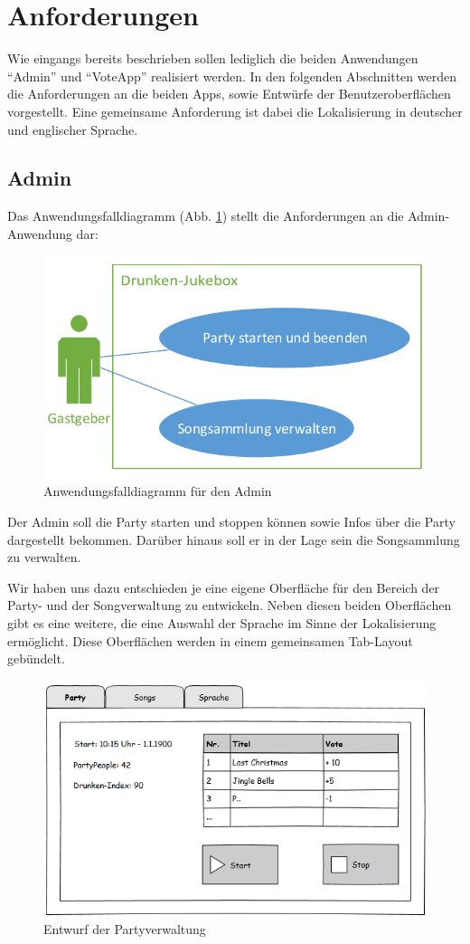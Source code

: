 \section{Anforderungen}
Wie eingangs bereits beschrieben sollen lediglich die beiden Anwendungen "`Admin"' und "`VoteApp"' realisiert werden. In den folgenden Abschnitten werden die Anforderungen an die beiden Apps, sowie Entwürfe der Benutzeroberflächen vorgestellt. Eine gemeinsame Anforderung ist dabei die Lokalisierung in deutscher und englischer Sprache.

\subsection{Admin}
Das Anwendungsfalldiagramm (Abb. \ref{fig:AdminUseCase}) stellt die Anforderungen an die Admin-Anwendung dar:

\begin{figure}[H]
\centering
\includegraphics[width=0.7\linewidth]{Bilder/AdminUseCase}
\caption{Anwendungsfalldiagramm für den Admin}
\label{fig:AdminUseCase}
\end{figure}

Der Admin soll die Party starten und stoppen können sowie Infos über die Party dargestellt bekommen. Darüber hinaus soll er in der Lage sein die Songsammlung zu verwalten.

Wir haben uns dazu entschieden je eine eigene Oberfläche für den Bereich der Party- und der Songverwaltung zu entwickeln. Neben diesen beiden Oberflächen gibt es eine weitere, die eine Auswahl der Sprache im Sinne der Lokalisierung ermöglicht. Diese Oberflächen werden in einem gemeinsamen Tab-Layout gebündelt.
  
\begin{figure}[H]
\centering
\includegraphics[width=0.85\linewidth]{Bilder/MockParty}
\caption{Entwurf der Partyverwaltung}
\label{fig:MockParty}
\end{figure}

